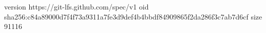 version https://git-lfs.github.com/spec/v1
oid sha256:c84a89000d7f4f73a9311a7fe3d9def4b4bbdf84909865f2da286f3c7ab7d6cf
size 91116
